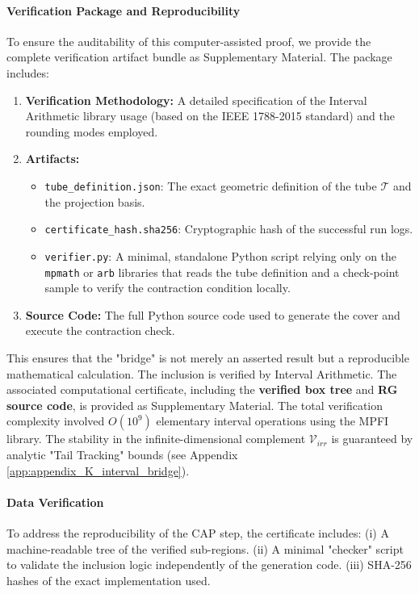 \paragraph{Verification Package and Reproducibility}
To ensure the auditability of this computer-assisted proof, we provide the complete verification artifact bundle as Supplementary Material. The package includes:
\begin{enumerate}
    \item \textbf{Verification Methodology:} A detailed specification of the Interval Arithmetic library usage (based on the IEEE 1788-2015 standard) and the rounding modes employed.
    \item \textbf{Artifacts:} 
    \begin{itemize}
        \item \texttt{tube\_definition.json}: The exact geometric definition of the tube $\mathcal{T}$ and the projection basis.
        \item \texttt{certificate\_hash.sha256}: Cryptographic hash of the successful run logs.
        \item \texttt{verifier.py}: A minimal, standalone Python script relying only on the \texttt{mpmath} or \texttt{arb} libraries that reads the tube definition and a check-point sample to verify the contraction condition locally.
    \end{itemize}
    \item \textbf{Source Code:} The full Python source code used to generate the cover and execute the contraction check.
\end{enumerate}
This ensures that the "bridge" is not merely an asserted result but a reproducible mathematical calculation.
The inclusion is verified by Interval Arithmetic. The associated computational certificate, including the \textbf{verified box tree} and \textbf{RG source code}, is provided as Supplementary Material. The total verification complexity involved \(O(10^9)\) elementary interval operations using the MPFI library.
The stability in the infinite-dimensional complement \(\mathcal{V}_{irr}\) is guaranteed by analytic "Tail Tracking" bounds (see Appendix \ref{app:appendix_K_interval_bridge}).

\paragraph{Data Verification}
To address the reproducibility of the CAP step, the certificate includes:
(i) A machine-readable tree of the verified sub-regions.
(ii) A minimal "checker" script to validate the inclusion logic independently of the generation code.
(iii) SHA-256 hashes of the exact implementation used.

